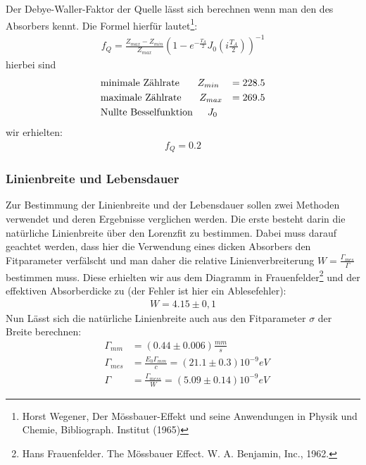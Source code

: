 \documentclass[12pt]{article}
\begin{document}
Der Debye-Waller-Faktor der Quelle lässt sich berechnen wenn man den des Absorbers kennt. Die Formel hierfür lautet\footnote{Horst Wegener, Der Mössbauer-Effekt und seine Anwendungen in Physik und Chemie, Bibliograph. Institut (1965)}:
\begin{align*}
f_Q=\frac{Z_{max} - Z_{min}}{Z_{max}} \left( 1 - e^{-\frac{T_A}{2}} J_0 \left( i \frac{T_A}{2} \right) \right)^{-1}
\end{align*}
hierbei sind 
\begin{align*}
  &\textnormal{minimale Zählrate } \hspace{15pt} Z_{min} &= 228.5 \\
  &\textnormal{maximale Zählrate } \hspace{15pt} Z_{max} &= 269.5 \\
  &\textnormal{Nullte Besselfunktion} \hspace{15pt} J_0
\end{align*}
wir erhielten:
\begin{align*}
f_Q = 0.2
\end{align*}


\subsubsection{Linienbreite und Lebensdauer}
Zur Bestimmung der Linienbreite und der Lebensdauer sollen zwei Methoden verwendet und deren Ergebnisse verglichen werden. Die erste besteht darin
die natürliche Linienbreite über den Lorenzfit zu bestimmen. Dabei muss darauf geachtet werden, dass hier die Verwendung eines dicken Absorbers den
Fitparameter verfälscht und man daher die relative Linienverbreiterung $W = \frac{\Gamma_{mes}}{\Gamma}$ bestimmen muss. Diese erhielten wir aus dem 
Diagramm in Frauenfelder\footnote{Hans Frauenfelder. The Mössbauer Effect. W. A. Benjamin, Inc., 1962.} und der effektiven Absorberdicke zu (der Fehler ist hier ein Ablesefehler):
\begin{align*}
 W = 4.15 \pm 0,1
\end{align*}
Nun Lässt sich die  natürliche Linienbreite auch aus den Fitparameter $\sigma$ der Breite berechnen:
\begin{align*}
 &\Gamma_{mm} &= (0.44 \pm 0.006) \frac{mm}{s} \\
 &\Gamma_{mes} &= \frac{E_0\Gamma_{mm}}{c} = (21.1 \pm 0.3) 10^{-9}eV \\
 &\Gamma &= \frac{\Gamma_{mess}}{W} = (5.09 \pm 0.14) 10^{-9} eV
\end{align*}
\end{document}
